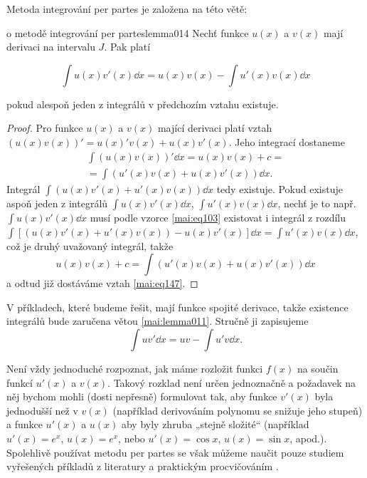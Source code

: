       Metoda integrování per partes je založena na této větě:
      \begin{mathlemma}{o metodě integrování per partes}{lemma014}       
        Nechť funkce \(u(x)\) a \(v(x)\) mají derivaci na intervalu \(J\). Pak platí 
        \begin{fleqn}[0pt]
          \begin{equation}\label{mai:eq147}
            \int u(x)v'(x)\dd{x} = u(x)v(x) - \int u'(x)v(x)\dd{x} 
          \end{equation}
        \end{fleqn}
        pokud alespoň jeden z integrálů v předchozím vztahu existuje. 
        \tcblower
        \begin{proof}
          Pro funkce \(u(x)\) a \(v(x)\) mající derivaci platí vztah \((u(x)v(x))' = u(x)'v(x) +
          u(x)v'(x)\). Jeho integrací dostaneme
          \begin{equation*}
            \begin{multlined}
              \int(u(x)v(x))'\dd{x} = u(x)v(x) + c  =  \\
              = \int\left(u'(x)v(x)+u(x)v'(x)\right)\dd{x}.
            \end{multlined}
          \end{equation*}
          Integrál \(\int(u(x)v'(x) + u'(x)v(x))\dd{x}\) tedy existuje. Pokud existuje aspoň jeden z
          integrálů \(\int u(x)v'(x)\dd{x}\), \(\int u'(x)v(x)\dd{x}\), nechť je to např. \(\int
          u(x)v'(x)\dd{x}\) musí podle vzorce \eqref{mai:eq103} existovat i integrál z rozdílu
          \(\int[(u(x)v'(x) + u'(x)v(x)) - u(x)v'(x)]\dd{x} = \int u'(x)v(x)\dd{x}\), což je druhý
          uvažovaný integrál, takže \[u(x)v(x) + c  = \int\left(u'(x)v(x)+u(x)v'(x)\right)\dd{x}\]
          a odtud již dostáváme vztah \eqref{mai:eq147}.
        \end{proof}
      \end{mathlemma}

      V příkladech, které budeme řešit, mají funkce spojité derivace, takže existence integrálů bude
      zaručena větou \eqref{mai:lemma011}. Stručně ji zapisujeme
      \begin{equation}\label{mai:eq149}
        \int uv'\dd{x} = uv - \int u'v\dd{x}.
      \end{equation}

      Není vždy jednoduché rozpoznat, jak máme rozložit funkci \(f(x)\) na součin funkcí \(u'(x)\) 
      a \(v(x)\). Takový rozklad není určen jednoznačně a požadavek na něj bychom mohli (dosti 
      nepřesně) formulovat tak, aby funkce \(v'(x)\) byla jednodušší než v \(v(x)\) (například 
      derivováním polynomu se snižuje jeho stupeň) a funkce \(u'(x)\) a \(u(x)\) aby byly zhruba 
      „stejně složité“ (například \(u'(x) =e^x\), \(u(x) = e^x\), nebo \(u'(x) = \cos x\), \(u(x) = 
      \sin x\), apod.). Spolehlivě používat metodu per partes se však můžeme naučit pouze studiem 
      vyřešených příkladů z literatury a praktickým procvičováním \cite[p.~138]{Musilova2009MA1}.


